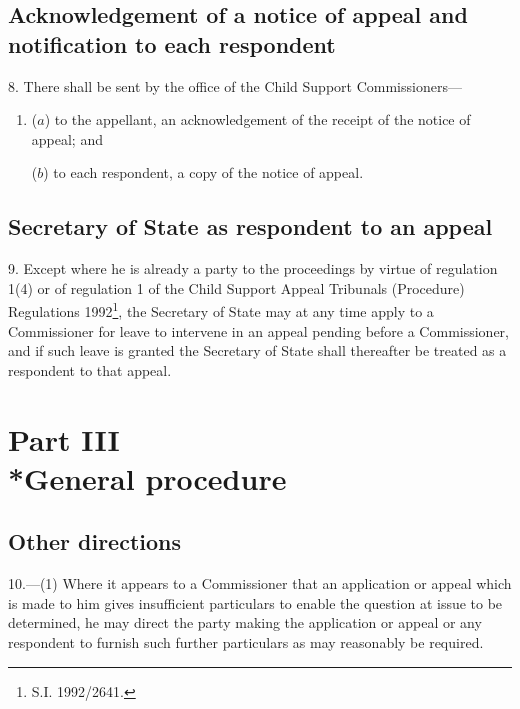 \documentclass[12pt,a4paper]{article}
\begin{document}
\subsection[8. Acknowledgement of a notice of appeal and notification to each respondent]{Acknowledgement of a notice of appeal and notification to each respondent}

8.  There shall be sent by the office of the Child Support Commissioners—
\begin{enumerate}\item[]
($a$) to the appellant, an acknowledgement of the receipt of the notice of appeal; and

($b$) to each respondent, a copy of the notice of appeal.
\end{enumerate}

\subsection[9. Secretary of State as respondent to an appeal]{Secretary of State as respondent to an appeal}

9.  
Except where he is already a party to the proceedings by virtue of regulation 1(4) or of regulation 1 of the Child Support Appeal Tribunals (Procedure) Regulations 1992\footnote{\frenchspacing S.I. 1992/2641.},  %
the Secretary of State may at any time apply to a Commissioner for leave to intervene in an appeal pending before a Commissioner, and if such leave is granted the Secretary of State shall thereafter be treated as a respondent to that appeal.



\section[Part III --- General procedure]{Part III\\*General procedure}

\renewcommand\parthead{--- Part III}

\subsection[10. Other directions]{Other directions}

10.—(1) Where it appears to a Commissioner that an application or appeal which is made to him gives insufficient particulars to enable the question at issue to be determined, he may direct the party making the application or appeal or any respondent to furnish such further particulars as may reasonably be required.
\end{document}
